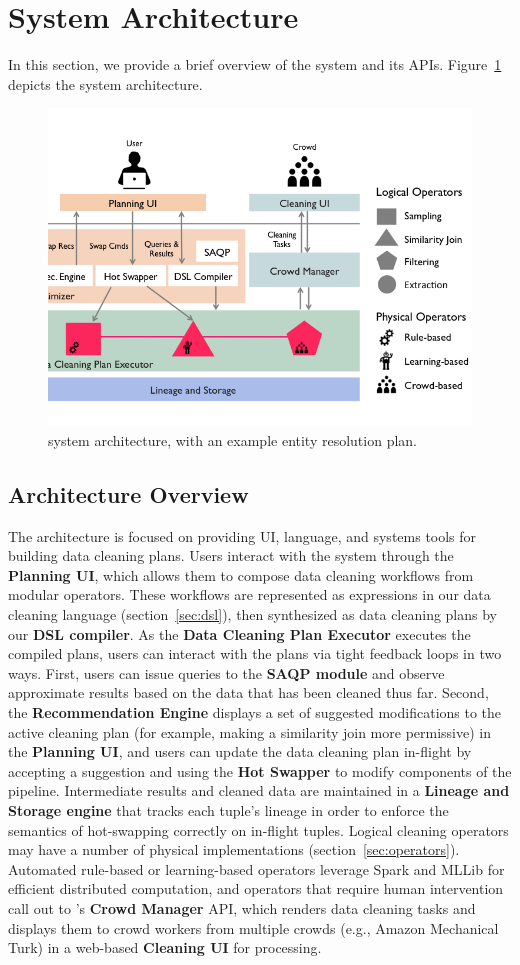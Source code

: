 \section{System Architecture}

In this section, we provide a brief overview of the \sys system and its APIs.
Figure~\ref{fig:arch} depicts the system architecture.

\begin{figure}[t]
\centering
\vspace{-0.5cm}
\includegraphics[width = .5\textwidth]{figs/architecture.png}
\vspace{-1cm}
\caption{\sys system architecture, with an example entity resolution plan.}
\label{fig:arch}
\end{figure}

\subsection{Architecture Overview}
The \sys architecture is focused on providing UI, language, and systems tools for building data cleaning plans.
Users interact with the system through the \textbf{Planning UI}, which allows them to compose data cleaning workflows from modular operators.
These workflows are represented as expressions in our data cleaning language (section~\ref{sec:dsl}), then synthesized as data cleaning plans by our \textbf{DSL compiler}.
As the \textbf{Data Cleaning Plan Executor} executes the compiled plans, users can interact with the plans via tight feedback loops in two ways.
First, users can issue queries to the \textbf{SAQP module} and observe approximate results based on the data that has been cleaned thus far.
Second, the \textbf{Recommendation Engine} displays a set of suggested modifications to the active cleaning plan (for example, making a similarity join more permissive) in the \textbf{Planning UI}, and users can update the data cleaning plan in-flight by accepting a suggestion and using the \textbf{Hot Swapper} to modify components of the pipeline.
Intermediate results and cleaned data are maintained in a \textbf{Lineage and Storage engine} that tracks each tuple's lineage in order to enforce the semantics of hot-swapping correctly on in-flight tuples.
Logical cleaning operators may have a number of physical implementations (section~\ref{sec:operators}).
Automated rule-based or learning-based operators leverage Spark and MLLib for efficient distributed computation, and operators that require human intervention call out to \sys's \textbf{Crowd Manager} API, which renders data cleaning tasks and displays them to crowd workers from multiple crowds (e.g., Amazon Mechanical Turk) in a web-based \textbf{Cleaning UI} for processing.

